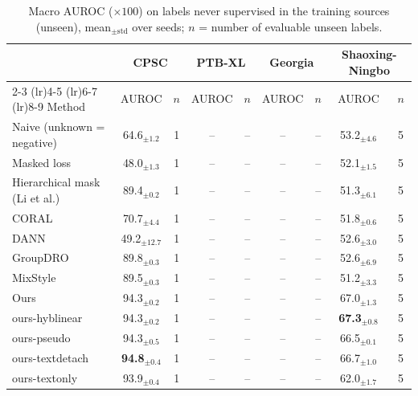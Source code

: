 \begin{table}[!htbp]
\centering
\footnotesize
\setlength{\tabcolsep}{3pt}
\caption{Macro AUROC ($\times 100$) on labels never supervised in the training sources (unseen), mean$_{\pm\mathrm{std}}$ over seeds; $n$ = number of evaluable unseen labels.}
\label{tab:unseen}
\begin{tabular}{lcccccccc}
\toprule
 & \multicolumn{2}{c}{CPSC} & \multicolumn{2}{c}{PTB-XL} & \multicolumn{2}{c}{Georgia} & \multicolumn{2}{c}{Shaoxing-Ningbo} \\
\cmidrule(lr){2-3} \cmidrule(lr){4-5} \cmidrule(lr){6-7} \cmidrule(lr){8-9}
Method & AUROC & $n$ & AUROC & $n$ & AUROC & $n$ & AUROC & $n$ \\
\midrule
Naive (unknown = negative) & 64.6$_{\pm 1.2}$ & 1 & -- & -- & -- & -- & 53.2$_{\pm 4.6}$ & 5 \\
Masked loss & 48.0$_{\pm 1.3}$ & 1 & -- & -- & -- & -- & 52.1$_{\pm 1.5}$ & 5 \\
Hierarchical mask (Li et al.) & 89.4$_{\pm 0.2}$ & 1 & -- & -- & -- & -- & 51.3$_{\pm 6.1}$ & 5 \\
CORAL & 70.7$_{\pm 4.4}$ & 1 & -- & -- & -- & -- & 51.8$_{\pm 0.6}$ & 5 \\
DANN & 49.2$_{\pm 12.7}$ & 1 & -- & -- & -- & -- & 52.6$_{\pm 3.0}$ & 5 \\
GroupDRO & 89.8$_{\pm 0.3}$ & 1 & -- & -- & -- & -- & 52.6$_{\pm 6.9}$ & 5 \\
MixStyle & 89.5$_{\pm 0.3}$ & 1 & -- & -- & -- & -- & 51.2$_{\pm 3.3}$ & 5 \\
Ours & 94.3$_{\pm 0.2}$ & 1 & -- & -- & -- & -- & 67.0$_{\pm 1.3}$ & 5 \\
ours-hyblinear & 94.3$_{\pm 0.2}$ & 1 & -- & -- & -- & -- & \textbf{67.3}$_{\pm 0.8}$ & 5 \\
ours-pseudo & 94.3$_{\pm 0.5}$ & 1 & -- & -- & -- & -- & 66.5$_{\pm 0.1}$ & 5 \\
ours-textdetach & \textbf{94.8}$_{\pm 0.4}$ & 1 & -- & -- & -- & -- & 66.7$_{\pm 1.0}$ & 5 \\
ours-textonly & 93.9$_{\pm 0.4}$ & 1 & -- & -- & -- & -- & 62.0$_{\pm 1.7}$ & 5 \\
\bottomrule
\end{tabular}
\end{table}
